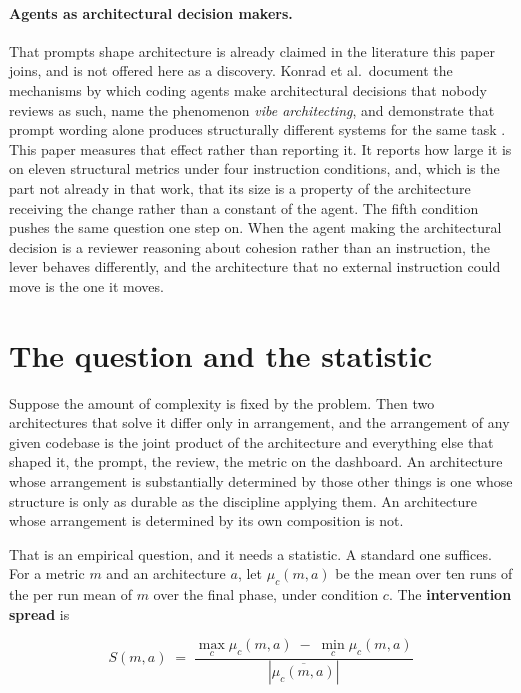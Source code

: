 \documentclass[11pt,a4paper]{article}
\begin{document}
\paragraph{Agents as architectural decision makers.} That prompts shape
architecture is already claimed in the literature this paper joins, and is not
offered here as a discovery. Konrad et al.\ document the mechanisms by which
coding agents make architectural decisions that nobody reviews as such, name the
phenomenon \emph{vibe architecting}, and demonstrate that prompt wording alone
produces structurally different systems for the same task \cite{vibearch}. This
paper measures that effect rather than reporting it. It reports how large it is on eleven
structural metrics under four instruction conditions, and, which is the part not
already in that work, that its size is a property of the architecture receiving
the change rather than a constant of the agent. The fifth condition pushes the
same question one step on. When the agent making the architectural decision is a
reviewer reasoning about cohesion rather than an instruction, the lever behaves
differently, and the architecture that no external instruction could move is the
one it moves.

\section{The question and the statistic}
\label{sec:statistic}

Suppose the amount of complexity is fixed by the problem. Then two
architectures that solve it differ only in arrangement, and the arrangement of
any given codebase is the joint product of the architecture and everything else
that shaped it, the prompt, the review, the metric on the dashboard. An
architecture whose arrangement is substantially determined by those other
things is one whose structure is only as durable as the discipline applying
them. An architecture whose arrangement is determined by its own composition is
not.

That is an empirical question, and it needs a statistic. A standard one
suffices. For a metric $m$ and
an architecture $a$, let $\mu_{c}(m,a)$ be the mean over ten runs of the
per run mean of $m$ over the final phase, under condition $c$. The
\textbf{intervention spread} is

\begin{equation}
S(m,a) \;=\; \frac{\max_{c} \mu_{c}(m,a) \;-\; \min_{c} \mu_{c}(m,a)}
                  {\left|\overline{\mu_{c}(m,a)}\right|}
\end{equation}
\end{document}

